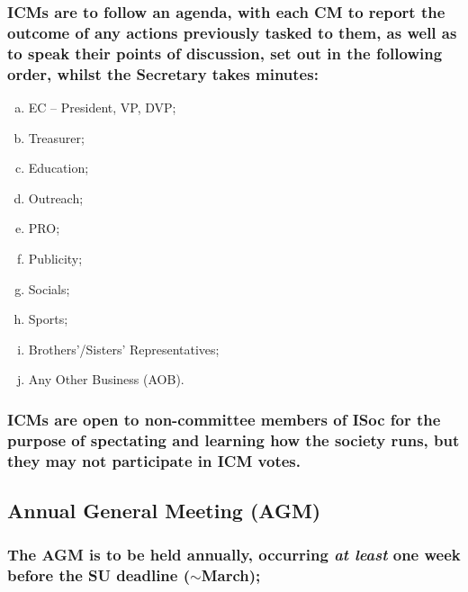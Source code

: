 \documentclass[12pt]{article}
\begin{document}
\subsubsection{ICMs are to follow an agenda, with each CM to report the outcome of any actions previously tasked to them, as well as to speak their points of discussion, set out in the following order, whilst the Secretary takes minutes:}
\begin{displayquote}
\begin{enumerate}[a.]
\item EC -- President, VP, DVP;
\item Treasurer;
\item Education;
\item Outreach;
\item PRO;
\item Publicity;
\item Socials;
\item Sports;
\item Brothers'/Sisters' Representatives;
\item Any Other Business (AOB).
\end{enumerate}
\end{displayquote}
\subsubsection{ICMs are open to non-committee members of ISoc for the purpose of spectating and learning how the society runs, but they may not participate in ICM votes.}

\subsection{Annual General Meeting (AGM)}
\subsubsection{The AGM is to be held annually, occurring \emph{at least} one week before the SU deadline ($\sim$March);}
\end{document}
